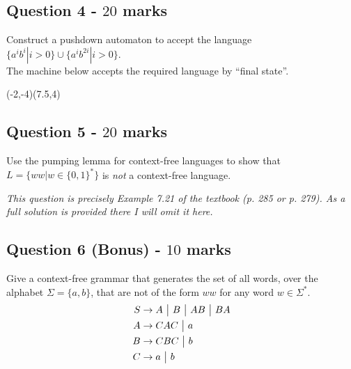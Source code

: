 \documentclass[12pt]{article}
\begin{document}

\subsection*{Question 4 - $20$ marks}
Construct a pushdown automaton to accept the language $\{a^ib^i | i>0 \} \cup \{ a^i b^{2i} | i>0 \}.$\\

The machine below accepts the required language by ``final state''.
\begin{center}
\begin{VCPicture}{(-2,-4)(7.5,4)}
\SmallState
{}      %







\end{VCPicture}
\end{center}


\subsection*{Question 5 - $20$ marks}
Use the pumping lemma for context-free languages to show that $L = \{ ww | w \in \{0,1\}^* \}$ is \emph{not} a context-free language.

\emph{This question is precisely Example 7.21 of the textbook (p. 285 or p. 279). As a full solution is provided there I will omit it here.}


\clearpage
\subsection*{Question 6 (Bonus) - $10$ marks}
Give a context-free grammar that generates the set of all words, over the alphabet $\Sigma = \{a,b\}$, that are not of the form $ww$ for any word $w \in \Sigma^*$.
\begin{align*}
S &\rightarrow A \text{ }\big|\text{ } B \text{ }\big|\text{ } AB \text{ }\big|\text{ } BA \\
A &\rightarrow CAC \text{ }\big|\text{ } a \\
B &\rightarrow CBC \text{ }\big|\text{ } b \\
C &\rightarrow a \text{ }\big|\text{ } b
\end{align*}


\PutEnd
\end{document}
